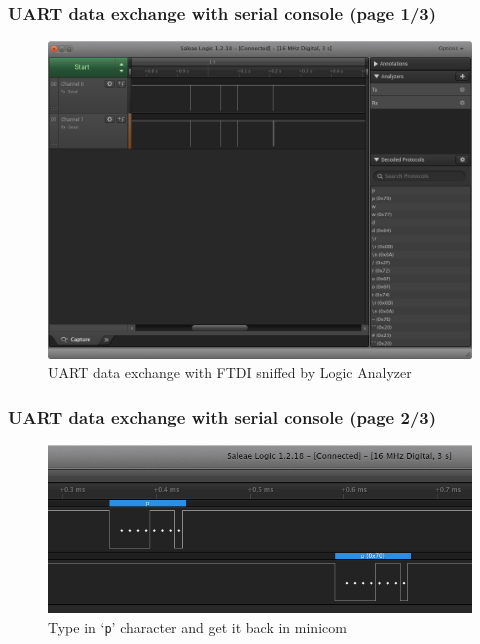 \begin{frame}
  \frametitle{UART data exchange with serial console (page 1/3)}
  \begin{figure}
    \centering
    \includegraphics[scale=0.32]{images/la-uart-window.png}
    \vspace*{-1mm}
    \caption{UART data exchange with FTDI sniffed by Logic Analyzer}
  \end{figure}
  \vspace*{-11mm}
\end{frame}

\begin{frame}
  \frametitle{UART data exchange with serial console (page 2/3)}
  \begin{figure}
    \centering
    \includegraphics[scale=0.55]{images/la-uart-char.png}
    \caption{Type in `\texttt{p}' character and get it back in minicom}
  \end{figure}
\end{frame}

